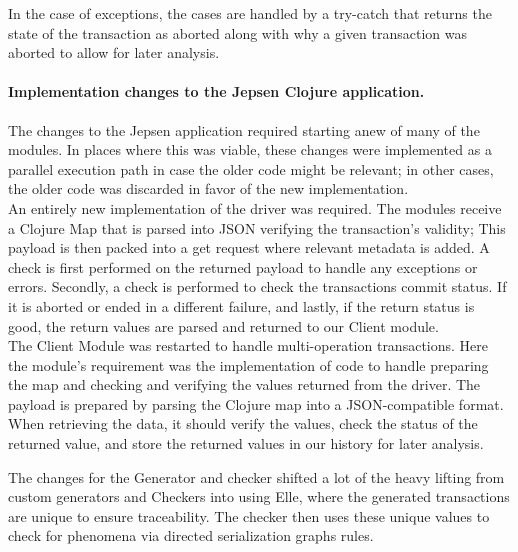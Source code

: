 \documentclass[a4paper,10pt,titlepage]{report}
\begin{document}
In the case of exceptions, the cases are handled by a try-catch that returns the state of the transaction as aborted along with why a given transaction was aborted to allow for later analysis.

\paragraph*{Implementation changes to the Jepsen Clojure application.}


The changes to the Jepsen application required starting anew of many of the modules. In places where this was viable, these changes were implemented as a parallel execution path in case the older code might be relevant; in other cases, the older code was discarded in favor of the new implementation.
\\
\vspace{5mm}
An entirely new implementation of the driver was required. The modules receive a Clojure Map that is parsed into JSON verifying the transaction's validity; This payload is then packed into a get request where relevant metadata is added. A check is first performed on the returned payload to handle any exceptions or errors. Secondly, a check is performed to check the transactions commit status. If it is aborted or ended in a different failure, and lastly, if the return status is good, the return values are parsed and returned to our Client module.
\\
\vspace{5mm}
The Client Module was restarted to handle multi-operation transactions. Here the module's requirement was the implementation of code to handle preparing the map and checking and verifying the values returned from the driver. The payload is prepared by parsing the Clojure map into a JSON-compatible format. When retrieving the data, it should verify the values, check the status of the returned value, and store the returned values in our history for later analysis.
\\
\vspace{5mm}
    
The changes for the Generator and checker shifted a lot of the heavy lifting from custom generators and Checkers into using Elle, where the generated transactions are unique to ensure traceability. The checker then uses these unique values to check for phenomena via directed serialization graphs rules.
\\
\vspace{5mm}
\end{document}
